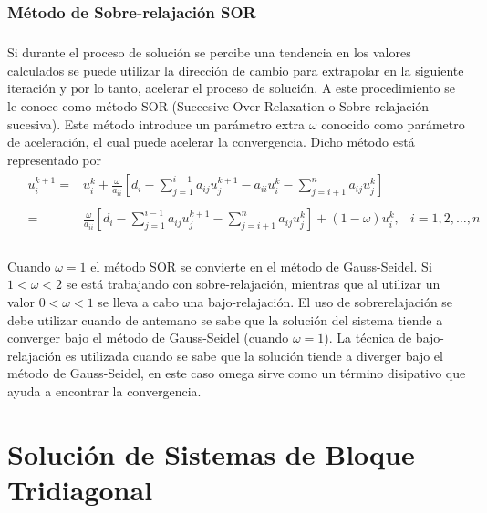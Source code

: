 \documentclass[letterpaper, openright, 12pt]{book}
\begin{document}
    \subsection{Método de Sobre-relajación SOR}
    \paragraph*{}
     Si durante el proceso de solución se percibe una tendencia en los
     valores calculados se puede utilizar la dirección de cambio para
     extrapolar en la siguiente iteración y por lo tanto, acelerar el
     proceso de solución. A este procedimiento se le conoce como método SOR
     (Succesive Over-Relaxation o  Sobre-relajación sucesiva). Este método
     introduce un parámetro extra $\omega$ conocido como parámetro de
     aceleración, el cual puede acelerar la convergencia. Dicho método está
     representado por
     \begin{align}
         &\begin{aligned}
             u_{i}^{k+1} =& u_{i}^{k} + \frac{\omega}{a_{ii}} \left[ d_{i} - \sum_{j = 1}^{i - 1}a_{ij}u_{j}^{k+1} - a_{ii}u_{i}^{k} - \sum_{j = i+1}^{n} a_{ij}u_{j}^{k} \right]
             \\ \\
             =& \frac{\omega}{a_{ii}} \left[ d_{i} - \sum_{j = 1}^{i - 1} a_{ij}u_{j}^{k+1} - \sum_{j = i+1}^{n} a_{ij}u_j ^{k}\right] + \left( 1 - \omega \right) u_{i}^{k}, &i = 1, 2, \dotsc, n
         \end{aligned}
     \end{align}
    \paragraph*{}
    Cuando $\omega = 1$ el método SOR se convierte en el método de
    Gauss-Seidel. Si $1 < \omega < 2$ se está trabajando con
    sobre-relajación, mientras que al utilizar un valor $0 < \omega < 1$ se
    lleva a cabo una bajo-relajación. El uso de sobrerelajación se debe
    utilizar cuando de antemano se sabe que la solución del sistema tiende
    a converger bajo el método de Gauss-Seidel (cuando $\omega = 1$). La
    técnica de bajo-relajación es utilizada cuando se sabe que la solución
    tiende a diverger bajo el método de Gauss-Seidel, en este caso omega
    sirve como un término disipativo que ayuda a encontrar la convergencia.

\chapter{Solución de Sistemas de Bloque Tridiagonal}\label{appTridiagonal}
\end{document}
